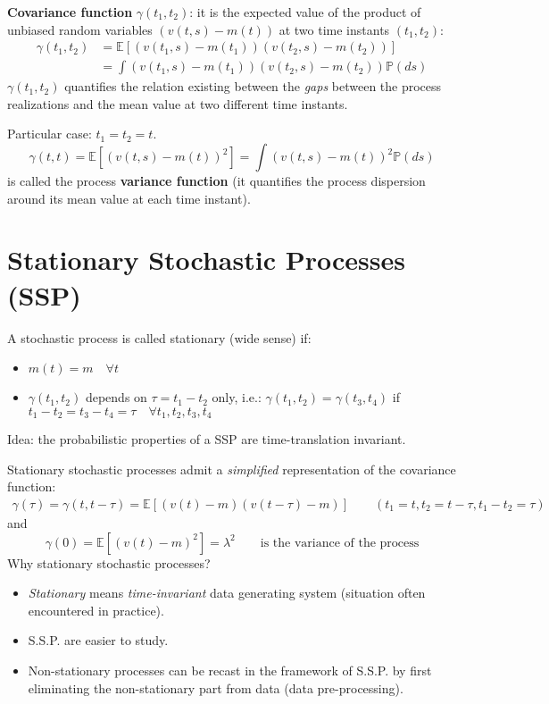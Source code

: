 \documentclass[10pt,a4paper,twoside,openright]{book}
\begin{document}
\textbf{Covariance function} $\gamma(t_{1}, t_{2})$: it is the expected value of the product of unbiased random variables $(v(t, s)-m(t))$ at two time instants $(t_{1}, t_{2}):$
\begin{align*}
	\gamma(t_{1}, t_{2}) &=\mathbb{E}[(v(t_{1}, s)-m(t_{1}))(v(t_{2}, s)-m(t_{2}))] \\
	&=\int(v(t_{1}, s)-m(t_{1}))(v(t_{2}, s)-m(t_{2})) \mathbb{P}(ds)
\end{align*}
$\gamma(t_{1}, t_{2})$ quantifies the relation existing between the \emph{gaps} between the process realizations and the mean value at two different time instants.

Particular case: $t_{1}=t_{2}=t$.
\[
	\gamma(t, t)=\mathbb{E}[(v(t, s)-m(t))^{2}]=\int(v(t, s)-m(t))^{2} \mathbb{P}(ds)
\]
is called the process \textbf{variance function} (it quantifies the process dispersion around its mean value at each time instant).

\section{Stationary Stochastic Processes (SSP)}
A stochastic process is called stationary (wide sense) if:
\begin{itemize}
	\item $m(t)=m \quad \forall t$
	\item $\gamma(t_{1}, t_{2})$ depends on $\tau=t_{1}-t_{2}$ only, i.e.: $\gamma(t_{1}, t_{2})=\gamma(t_{3}, t_{4})$ if $t_{1}-t_{2}=t_{3}-t_{4}=\tau \quad \forall t_{1}, t_{2}, t_{3}, t_{4}$
\end{itemize}
Idea: the probabilistic properties of a SSP are time-translation invariant.

Stationary stochastic processes admit a \emph{simplified} representation of the covariance function:
\begin{gather*}
\gamma(\tau)=\gamma(t, t-\tau)=\mathbb{E}[(v(t)-m)(v(t-\tau)-m)]\qquad (t_{1}=t, t_{2}=t-\tau, t_{1}-t_{2}=\tau)
\end{gather*}
and
\[
	\gamma(0)=\mathbb{E}[(v(t)-m)^{2}]=\lambda^2  \qquad \text{is the variance of the process}
\]
Why stationary stochastic processes?
\begin{itemize}
	\item \emph{Stationary} means \emph{time-invariant} data generating system (situation often encountered in practice).
	\item S.S.P. are easier to study.
	\item Non-stationary processes can be recast in the framework of S.S.P. by first eliminating the non-stationary part from data (data pre-processing).
\end{itemize}
\end{document}
